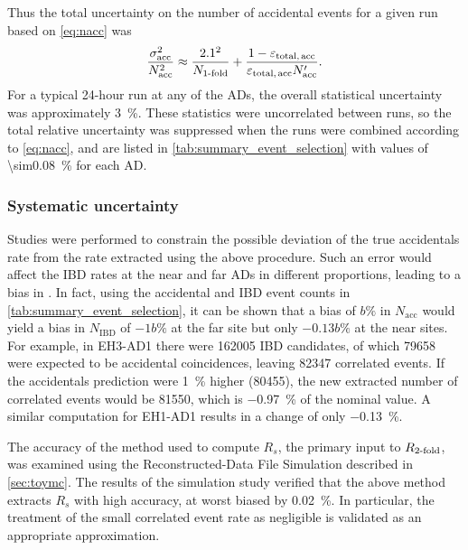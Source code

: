 Thus the total uncertainty on the number of accidental events
for a given run based on \cref{eq:nacc} was
\begin{equation}\label{eq:sigma_acc}
    \frac{\sigma_\text{acc}^2}{N_\text{acc}^2} \approx
    \frac{2.1^2}{N_\text{\ensuremath{1}-fold}}
    + \frac{1-\varepsilon_\text{total,\,acc}}{
        \varepsilon_\text{total,\,acc} N_\text{acc}'
    }.
\end{equation}
For a typical 24-hour run at any of the ADs,
the overall statistical uncertainty was approximately \SI{3}{\percent}.
These statistics were uncorrelated between runs,
so the total relative uncertainty was suppressed
when the runs were combined according to \cref{eq:nacc},
and are listed in \cref{tab:summary_event_selection}
with values of \SI{\sim0.08}{\percent} for each AD.

\subsubsection{Systematic uncertainty}

Studies were performed to constrain the possible deviation
of the true accidentals rate
from the rate extracted using the above procedure.
Such an error would affect the IBD rates at the near and far ADs in different proportions,
leading to a bias in \thetaot{}.
In fact, using the accidental and IBD event counts in \cref{tab:summary_event_selection},
it can be shown that a bias of $b\si{\percent}$ in $N_{\text{acc}}$
would yield a bias in $N_{\text{IBD}}$ of $-1b\si{\percent}$ at the far site
but only $-0.13b\si{\percent}$ at the near sites.
For example, in EH3-AD1 there were \num{162005} IBD candidates,
of which \num{79658} were expected to be accidental coincidences,
leaving \num{82347} correlated events.
If the accidentals prediction were \SI{1}{\percent} higher (\num{80455}),
the new extracted number of correlated events would be \num{81550},
which is \SI{-0.97}{\percent} of the nominal value.
A similar computation for EH1-AD1 results in a change of only \SI{-0.13}{\percent}.

The accuracy of the method used to compute $R_{s}$,
the primary input to $R_{\text{\ensuremath{2}-fold}}$,
was examined using the Reconstructed-Data File Simulation described in \cref{sec:toymc}.
The results of the simulation study verified that
the above method extracts $R_s$ with high accuracy, at worst biased by \SI{0.02}{\percent}.
In particular, the treatment of the small correlated event rate as negligible
is validated as an appropriate approximation.

